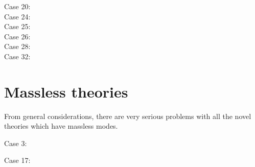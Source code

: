 \documentclass[aps,prd,reprint,preprintnumbers,superscriptaddress,showpacs,floatfix]{revtex4-2}
\begin{document}
Case 20:
\begin{equation}
  
  \label{<+label+>}
\end{equation}
Case 24:
\begin{equation}
  
  \label{<+label+>}
\end{equation}
Case 25:
\begin{equation}
  
  \label{<+label+>}
\end{equation}
Case 26:
\begin{equation}
  
  \label{<+label+>}
\end{equation}
Case 28:
\begin{equation}
  
  \label{<+label+>}
\end{equation}
Case 32:
\begin{equation}
  
  \label{<+label+>}
\end{equation}

\section{Massless theories}

From general considerations, there are very serious problems with all the novel theories which have massless modes.

Case 3:
\begin{equation}
  
  \label{<+label+>}
\end{equation}

Case 17:
\begin{equation}
  
  \label{<+label+>}
\end{equation}

\begin{acknowledgments}


\end{acknowledgments}



\end{document}
